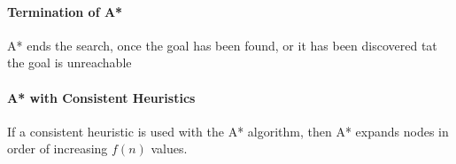 \documentclass[a4paper,headsepline,12pt]{scrartcl}
\begin{document}
\paragraph{Termination of A*} A* ends the search, once the goal has been found, or it has been discovered tat the goal is unreachable
\paragraph{A* with Consistent Heuristics}
If a consistent heuristic is used with the A* algorithm, then A* expands nodes in order of increasing \(f(n)\) values.
\end{document}
